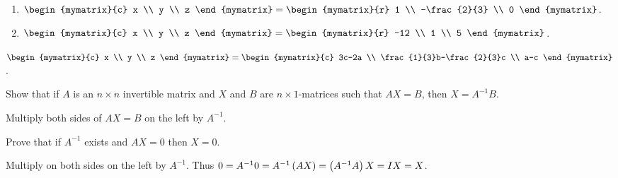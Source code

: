 \begin{enumialphparenastyle}
\begin{ex}
  \begin{sol}
    \begin{enumerate}
    \item $\def\arraystretch{1.2}
      \begin{mymatrix}{c}
        x \\
        y \\
        z
      \end{mymatrix} =\begin{mymatrix}{r}
        1 \\
        -\frac{2}{3} \\
        0
      \end{mymatrix}$.
    \item $\begin{mymatrix}{c}
        x \\
        y \\
        z
      \end{mymatrix} = \begin{mymatrix}{r}
        -12 \\
        1 \\
        5
      \end{mymatrix}$.
    \end{enumerate}
    $\def\arraystretch{1.2}
    \begin{mymatrix}{c}
      x \\
      y \\
      z
    \end{mymatrix} = 
    \begin{mymatrix}{c}
      3c-2a \\
      \frac{1}{3}b-\frac{2}{3}c \\
      a-c
    \end{mymatrix}$.
  \end{sol}
\end{ex}

\begin{ex}
  Show that if $A$ is an $n\times n$ invertible matrix and $X$ and $B$
  are $n\times 1$-matrices such that $AX=B$, then $X=A^{-1}B$.
  \begin{sol}
    Multiply both sides of $AX=B$ on the left by $A^{-1}$.
  \end{sol}
\end{ex}

\begin{ex}
  Prove that if $A^{-1}$ exists and $AX=0$ then $X=0$.
  \begin{sol}
    Multiply on both sides on the left by $A^{-1}$. Thus
    $0=A^{-1}0=A^{-1}\left(AX\right) =\left( A^{-1}A\right) X=IX = X$.
  \end{sol}
\end{ex}


\end{enumialphparenastyle}
